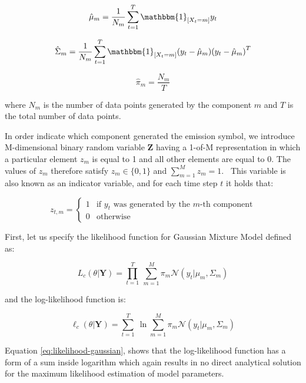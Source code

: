 \begin{equation}
    \hat{\mu}_m = \frac{1}{N_m} \sum_{t=1}^{T} \mathbbm{1}_{[X_t = m]} y_t
\end{equation}

\begin{equation}
    \hat{\Sigma}_m = \frac{1}{N_m} \sum_{t=1}^{T} \mathbbm{1}_{[X_t = m]} {\left(y_t - \hat{\mu}_m)(y_t - \hat{\mu}_m \right)}^T
\end{equation}

\begin{equation}
    \hat{\pi}_m = \frac{N_m}{T}
\end{equation}
    
\noindent where $N_m$ is the number of data points generated by the component $m$ and $T$ is the total number of data points. 

In order indicate which component generated the emission symbol, we introduce M-dimensional binary random variable $\textbf{Z}$ having a 1-of-M representation 
in which a particular element $z_m$ is equal to 1 and all other elements are equal to 0. The values of $z_m$ therefore satisfy $z_m \in \{0, 1\}$ and 
$\sum_{m=1}^{M} z_m = 1$.~\citep{Bishop2006} This variable is also known as an indicator variable, and for each time step $t$ it holds that:

\begin{equation}
    z_{t,m} = \begin{cases}
        1 & \text{if } y_t \text{ was generated by the } m\text{-th component} \\
        0 & \text{otherwise}
    \end{cases}
\end{equation}

\noindent First, let us specify the likelihood function for Gaussian Mixture Model defined as: 

\begin{equation} \label{eq:likelihood-gaussian}
    L_c(\theta|\textbf{Y}) = \prod_{t=1}^{T}\: \sum_{m=1}^{M} \pi_m \mathcal{N}(y_t|\mu_m,\Sigma_m)
\end{equation}

and the log-likelihood function is:

\begin{equation} \label{eq:loglikelihood-gaussian}
    \ell_c(\theta|\textbf{Y}) = \sum_{t=1}^{T}\: \ln \sum_{m=1}^{M} \pi_m \mathcal{N}(y_t|\mu_m,\Sigma_m)
\end{equation}

Equation \ref{eq:likelihood-gaussian}, shows that the log-likelihood function has a form of a sum inside logarithm which again results in no direct analytical solution for the maximum likelihood estimation of model parameters.

